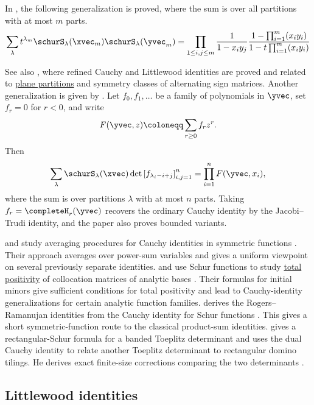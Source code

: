 In \cite{IshikawaTagawa2007}, the following generalization is proved,
where the sum is over all partitions with at most $m$ parts.
\begin{equation*}
 \sum_{\lambda} t^{\lambda_m} \schurS_\lambda(\xvec_m) \schurS_{\lambda}(\yvec_m)
 = \prod_{1\leq i,j \leq m} \frac{1}{1-x_i y_j} \frac{1 - \prod_{i=1}^m (x_i y_i) }{ 1 - t \prod_{i=1}^m (x_i y_i) }
\end{equation*}

See also \cite{BeteaWheeler2016}, where refined Cauchy and Littlewood
identities are proved and related to \hyperref[planePartitions]{plane partitions}
and symmetry classes of alternating sign matrices.
Another generalization is given by 
\cite{Bedratyuk2022x}.  Let $f_0,f_1,\dotsc$ be a family of polynomials in
$\yvec$, set $f_r=0$ for $r\lt 0$, and write
\[
  F(\yvec,z)\coloneqq \sum_{r\geq 0} f_r z^r.
\]
Then
\[
  \sum_{\lambda}
  \schurS_\lambda(\xvec)\det\left[f_{\lambda_i-i+j}\right]_{i,j=1}^n
  =
  \prod_{i=1}^n F(\yvec,x_i),
\]
where the sum is over partitions $\lambda$ with at most $n$ parts.  Taking
$f_r=\completeH_r(\yvec)$ recovers the ordinary Cauchy identity by the
Jacobi--Trudi identity, and the paper also proves bounded variants.

 and  study averaging procedures for Cauchy
identities in symmetric functions \cite{MironovMorozov2023}.  Their approach
averages over power-sum variables and gives a uniform viewpoint on several
previously separate identities.
 and  use Schur functions to study
\hyperref[totallyNonnegative]{total positivity} of collocation matrices of analytic bases
\cite{DiazMainar2026x}.  Their formulas for initial minors give sufficient
conditions for total positivity and lead to Cauchy-identity generalizations for
certain analytic function families.
 derives the Rogers--Ramanujan identities from the
Cauchy identity for Schur functions \cite{Stanton2025x}.  This gives a short
symmetric-function route to the classical product-sum identities.
 gives a rectangular-Schur formula for a banded Toeplitz
determinant and uses the dual Cauchy identity to relate another Toeplitz
determinant to rectangular domino tilings.  He derives exact finite-size
corrections comparing the two determinants \cite{Tierz2026x}.


\subsection[schurSums]{Littlewood identities}

